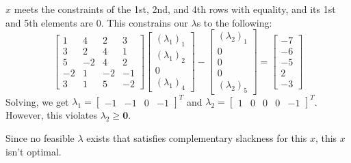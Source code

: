 \documentclass[12pt]{article}
\begin{document}
\begin{enumerate}
\begin{enumerate}
                        $x$ meets the constraints of the 1st, 2nd, and 4th rows with equality,
                        and its 1st and 5th elements are $0$.
                        This constrains our $\lambda$s to the following:
                        \[\begin{bmatrix}
                                    1  & 4  & 2  & 3  \\
                                    3  & 2  & 4  & 1  \\
                                    5  & -2 & 4  & 2  \\
                                    -2 & 1  & -2 & -1 \\
                                    3  & 1  & 5  & -2
                              \end{bmatrix}\begin{bmatrix}
                                    (\lambda_1)_1 \\ (\lambda_1)_2 \\ 0 \\ (\lambda_1)_4
                              \end{bmatrix} - \begin{bmatrix}
                                    (\lambda_2)_1 \\ 0 \\ 0 \\ 0 \\ (\lambda_2)_5
                              \end{bmatrix} = \begin{bmatrix}
                                    -7 \\ -6 \\ -5 \\ 2 \\ -3
                              \end{bmatrix}\]
                        Solving, we get $\lambda_1 = \begin{bmatrix}-1 & -1 & 0 & -1\end{bmatrix}^T$
                        and $\lambda_2 = \begin{bmatrix}1 & 0 & 0 & 0 & -1\end{bmatrix}^T$.
                        However, this violates $\lambda_2 \ge \mathbf{0}$.

                        Since no feasible $\lambda$ exists that satisfies
                        complementary slackness for this $x$, this $x$ isn't optimal.
            \end{enumerate}


\end{enumerate}
\end{document}
